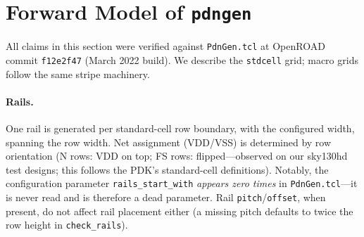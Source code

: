 \documentclass[11pt]{article}
\begin{document}
\section{Forward Model of \texttt{pdngen}}

All claims in this section were verified against \texttt{PdnGen.tcl} at
OpenROAD commit \texttt{f12e2f47} (March 2022 build).  We describe the
\texttt{stdcell} grid; macro grids follow the same stripe machinery.

\paragraph{Rails.} One rail is generated per standard-cell row boundary,
with the configured width, spanning the row width.  Net assignment
(VDD/VSS) is determined by row orientation (N rows: VDD on top;
FS rows: flipped---observed on our sky130hd test designs; this follows
the PDK's standard-cell definitions).  Notably, the configuration parameter
\texttt{rails\_start\_with} \emph{appears zero times} in
\texttt{PdnGen.tcl}---it is never read and is therefore a dead
parameter.  Rail \texttt{pitch}/\texttt{offset}, when present, do not
affect rail placement either (a missing pitch defaults to twice the row
height in \texttt{check\_rails}).
\end{document}
